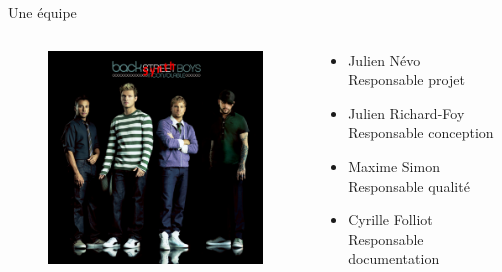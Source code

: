 \documentclass[frenchb]{beamer}
\begin{document}
\begin{frame}{Une équipe}
    \begin{columns}
        \begin{column}[l]{7cm}
            \begin{figure}
                \includegraphics[width=6cm ]{../img/png/back.jpg}
            \end{figure}
        \end{column}
    \begin{column}[l]{9cm}
    \begin{itemize}  
        \item Julien Névo\\\tiny{Responsable projet}\normalsize
        \item Julien Richard-Foy\\\tiny{Responsable conception}\normalsize
        \item Maxime Simon\\\tiny{Responsable qualité}\normalsize
        \item Cyrille Folliot\\\tiny{Responsable documentation}\normalsize
    \end{itemize}
    \end{column}
    \end{columns}
\end{frame}
\end{document}
